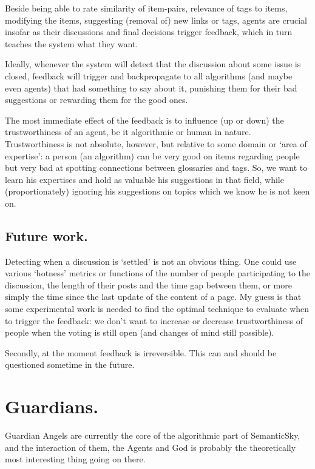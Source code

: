 \documentclass[11pt]{article}
\begin{document}
Beside being able to rate similarity of item-pairs, relevance of tags to items, modifying the items, suggesting (removal of) new links or tags, agents are crucial insofar as their discussions and final decisions trigger feedback, which in turn teaches the system what they want. 

Ideally, whenever the system will detect that the discussion about some issue is closed, feedback will trigger and backpropagate to all algorithms (and maybe even agents) that had something to say about it, punishing them for their bad suggestions or rewarding them for the good ones.

The most immediate effect of the feedback is to influence (up or down) the trustworthiness of an agent, be it algorithmic or human in nature.
Trustworthiness is not absolute, however, but relative to some domain or `area of expertise': a person (an algorithm) can be very good on items regarding people but very bad at spotting connections between glossaries and tags. So, we want to learn his expertises and hold as valuable his suggestions in that field, while (proportionately) ignoring his suggestions on topics which we know he is not keen on.

\subsection{Future work.}

Detecting when a discussion is `settled' is not an obvious thing. One could use various `hotness' metrics or functions of the number of people participating to the discussion, the length of their posts and the time gap between them, or more simply the time since the last update of the content of a page. My guess is that some experimental work is needed to find the optimal technique to evaluate when to trigger the feedback: we don't want to increase or decrease trustworthiness of people when the voting is still open (and changes of mind still possible).

Secondly, at the moment feedback is irreversible. This can and should be questioned sometime in the future.




\section{Guardians.}

Guardian Angels are currently the core of the algorithmic part of SemanticSky, and the interaction of them, the Agents and God is probably the theoretically most interesting thing going on there.
\end{document}
